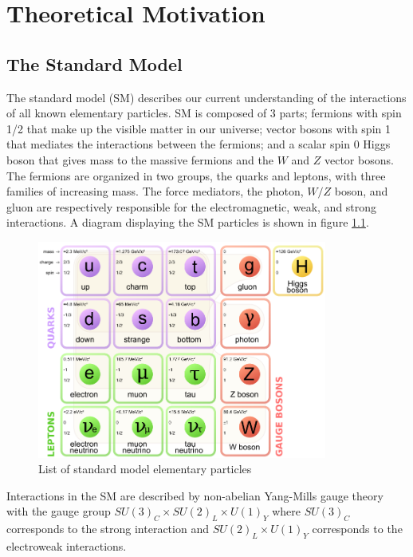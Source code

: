 
\chapter{Theoretical Motivation}
\label{chap:motivation}
\section{The Standard Model}

\indent  The standard model (SM) describes our current understanding of the interactions of all known elementary particles.  SM is composed of 3 parts; fermions with spin 1/2 that make up the visible matter in our universe; vector bosons with spin 1 that mediates the interactions between the fermions; and a scalar spin 0 Higgs boson that gives mass to the massive fermions and the $W$ and $Z$ vector bosons.  The fermions are organized in two groups, the quarks and leptons, with three families of increasing mass.  The force mediators, the photon, $W/Z$ boson, and gluon are respectively responsible for the electromagnetic, weak, and strong interactions.  A diagram displaying the SM particles is shown in figure \ref{fig:SM:part}. \\

\begin{figure}[htbp]
	\begin{center}
		\includegraphics[width=0.85\textwidth]{figures/theory/Standard_Model_of_Elementary_Particles.png}
		\caption{List of standard model elementary particles}
		\label{fig:SM:part}
	\end{center}
\end{figure}

\indent  Interactions in the SM are described by non-abelian Yang-Mills gauge theory with the gauge group $SU(3)_C \times SU(2)_L \times U(1)_Y$ where $SU(3)_C$ corresponds to the strong interaction and $SU(2)_L \times U(1)_Y$ corresponds to the electroweak interactions. 

